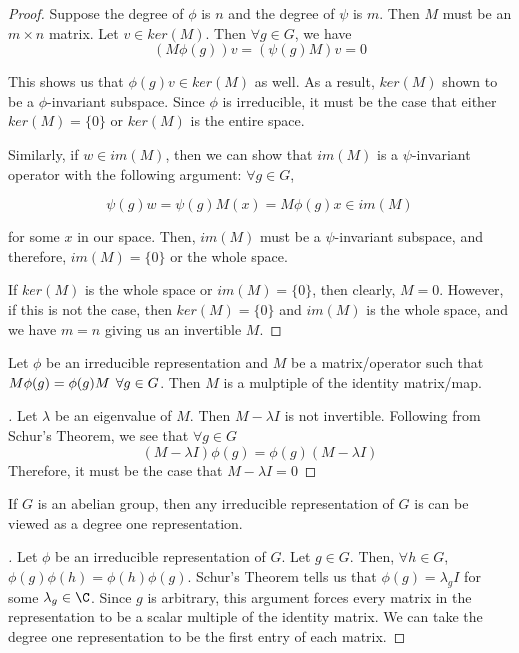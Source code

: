 \begin{proof}Suppose the degree of $\phi$ is $n$ and the degree of $\psi$ is $m$. Then $M$ must be an $m\times n$ matrix. Let $v\in ker(M)$. Then $\forall g \in G$, we have 
\begin{equation}
	 (M\phi(g))v= (\psi(g)M)v = 0
\end{equation}

This shows us that $\phi(g)v \in ker(M)$ as well. As a result, $ker(M)$ shown to be a $\phi$-invariant subspace. Since $\phi$ is irreducible, it must be the case that either $ker(M) =\{0\}$ or $ker(M)$ is the entire space.  

Similarly, if $w \in im(M)$, then we can show that $im(M)$ is a $\psi$-invariant operator with the following argument: $\forall g\in G$,

\begin{equation}
	\psi(g)w =\psi(g)M(x) = M\phi(g)x \in im(M)
\end{equation}

for some $x$ in our space. Then, $im(M)$ must be a $\psi$-invariant subspace, and therefore, $im(M) = \{0\}$ or the whole space.

If $ker(M)$ is the whole space or $im(M) = \{0\}$, then clearly, $M=0$. However, if this is not the case, then $ker(M) = \{0\}$ and $im(M)$ is the whole space, and we have $m=n$ giving us an invertible $M$. \end{proof}

\begin{corrolary}
	Let $\phi$ be an irreducible representation and $M$ be a matrix/operator such that $M\phi(g)=\phi(g)M \hspace{1.5mm}\forall g \in G$. Then $M$ is a mulptiple of the identity matrix/map.
\end{corrolary}

\begin{proof}[\cite{Mendes}]Let $\lambda$ be an eigenvalue of $M$. Then $M - \lambda I$ is not invertible. Following from Schur's Theorem, we see that $\forall g \in G$
$$(M-\lambda I)\phi(g) = \phi(g) (M-\lambda I)$$
Therefore, it must be the case that $M-\lambda I = 0$ \end{proof}

\begin{corrolary}
	If $G$ is an abelian group, then any irreducible representation of $G$ is can be viewed as a degree one representation.
\end{corrolary}

\begin{proof}[\cite{Tung}]Let $\phi$ be an irreducible representation of $G$. Let $g \in G$. Then, $\forall h \in G$, $\phi(g)\phi(h) = \phi(h)\phi(g)$. Schur's Theorem tells us that $\phi(g) = \lambda_g I$ for some $\lambda_g \in \C$. Since $g$ is arbitrary, this argument forces every matrix in the representation to be a scalar multiple of the identity matrix. We can take the degree one representation to be the first entry of each matrix.  \end{proof}

